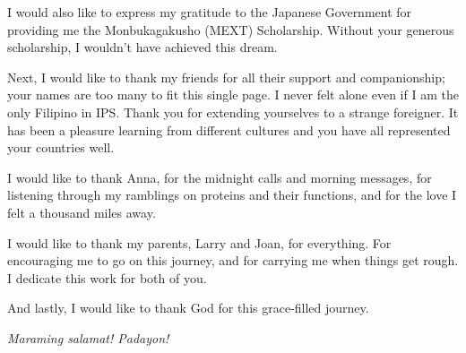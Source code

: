 \par I would also like to express my gratitude to the Japanese Government for
providing me the Monbukagakusho (MEXT) Scholarship. Without your generous
scholarship, I wouldn't have achieved this dream.

\par Next, I would like to thank my friends for all their support and
companionship; your names are too many to fit this single page.  I never felt
alone even if I am the only Filipino in IPS. Thank you for extending
yourselves to a strange foreigner. It has been a pleasure learning from
different cultures and you have all represented your countries well.

\par I would like to thank Anna, for the midnight calls and morning messages,
for listening through my ramblings on proteins and their functions, and for the
love I felt a thousand miles away.

\par I would like to thank my parents, Larry and Joan, for everything. For
encouraging me to go on this journey, and for carrying me when things get
rough. I dedicate this work for both of you.

\par And lastly, I would like to thank God for this grace-filled journey.

\vspace{5ex}
\textit{Maraming salamat! Padayon!}
